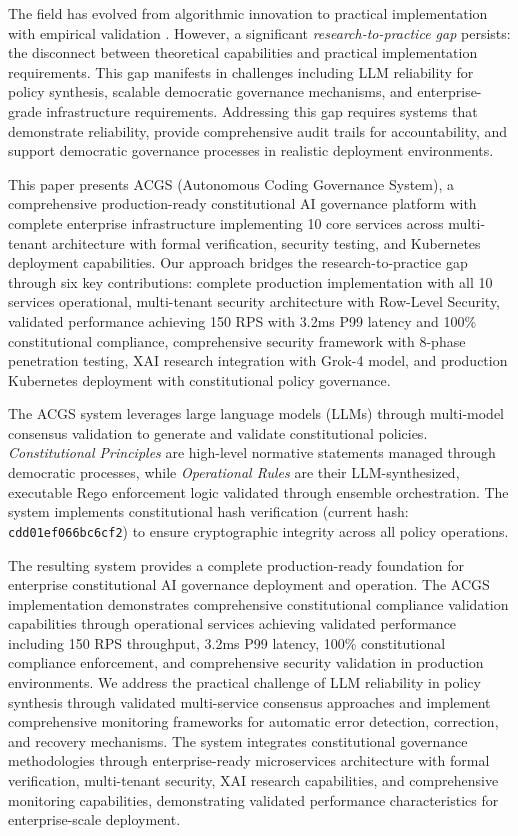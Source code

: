 \documentclass[manuscript,screen,9pt]{acmart}
\begin{document}
The field has evolved from algorithmic innovation to practical implementation with empirical validation \cite{StanfordJBLP2024AIGovernanceWeb3, StanfordLaw2025BulletProof}. However, a significant \textit{research-to-practice gap} persists: the disconnect between theoretical capabilities and practical implementation requirements. This gap manifests in challenges including LLM reliability for policy synthesis, scalable democratic governance mechanisms, and enterprise-grade infrastructure requirements. Addressing this gap requires systems that demonstrate reliability, provide comprehensive audit trails for accountability, and support democratic governance processes in realistic deployment environments.

This paper presents ACGS (Autonomous Coding Governance System), a comprehensive production-ready constitutional AI governance platform with complete enterprise infrastructure implementing 10 core services across multi-tenant architecture with formal verification, security testing, and Kubernetes deployment capabilities. Our approach bridges the research-to-practice gap through six key contributions: complete production implementation with all 10 services operational, multi-tenant security architecture with Row-Level Security, validated performance achieving 150 RPS with 3.2ms P99 latency and 100\% constitutional compliance, comprehensive security framework with 8-phase penetration testing, XAI research integration with Grok-4 model, and production Kubernetes deployment with constitutional policy governance.

The ACGS system leverages large language models (LLMs) through multi-model consensus validation to generate and validate constitutional policies. \textit{Constitutional Principles} are high-level normative statements managed through democratic processes, while \textit{Operational Rules} are their LLM-synthesized, executable Rego enforcement logic validated through ensemble orchestration. The system implements constitutional hash verification (current hash: \texttt{\small{cdd01ef066bc6cf2}}) to ensure cryptographic integrity across all policy operations.

The resulting system provides a complete production-ready foundation for enterprise constitutional AI governance deployment and operation. The ACGS implementation demonstrates comprehensive constitutional compliance validation capabilities through operational services achieving validated performance including 150 RPS throughput, 3.2ms P99 latency, 100\% constitutional compliance enforcement, and comprehensive security validation in production environments. We address the practical challenge of LLM reliability in policy synthesis through validated multi-service consensus approaches and implement comprehensive monitoring frameworks for automatic error detection, correction, and recovery mechanisms. The system integrates constitutional governance methodologies through enterprise-ready microservices architecture with formal verification, multi-tenant security, XAI research capabilities, and comprehensive monitoring capabilities, demonstrating validated performance characteristics for enterprise-scale deployment.
\end{document}
